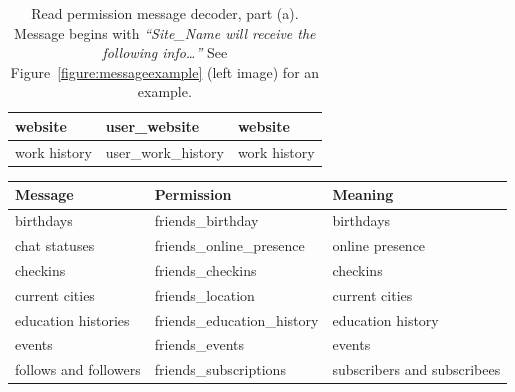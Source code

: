 \documentclass[10pt]{sig-alternate-10pt}
\begin{document}
\begin{subtables}
\begin{table}[htbp]
\begin{tabular}{|l|l|l|}
    website                               & user\_website               & website                                                                                     \\ \hline
    work history                          & user\_work\_history         & work history                                                                                \\ \hline
  \end{tabular}
  \caption{\label{first}Read permission message decoder, part (a). Message begins with \textit{``Site\_Name will receive the following info…''} See Figure~\ref{figure:messageexample} (left image) for an example.}
  \label{table:messagesr1}
\end{table}

\begin{table}[htbp]
  \centering
  \begin{tabular}{|l|l|l|}
    \hline
    \textbf{Message}                       & \textbf{Permission}            & \textbf{Meaning} \cite{fbpermissions}                                                                       \\ \hline \hline
    birthdays                              & friends\_birthday              & birthdays                                                                              \\ \hline
    chat statuses                          & friends\_online\_presence      & online presence                                                                        \\ \hline
    checkins                               & friends\_checkins              & checkins                                                                               \\ \hline
    current cities                         & friends\_location              & current cities                                                                         \\ \hline
    education histories                    & friends\_education\_history    & education history                                                                      \\ \hline
    events                                 & friends\_events                & events                                                                                 \\ \hline
    follows and followers                  & friends\_subscriptions         & subscribers and subscribees                                                            \\ \hline

\end{tabular}
\end{table}
\end{subtables}
\end{document}

